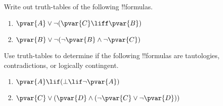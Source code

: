 \documentclass[../../../include/open-logic-section]{subfiles}
\begin{document}


\begin{prob}
    \citep[1.1 item 2]{MacFarlane-2020-PhilosophicalLogicContemporary}
    Write out truth-tables of the following !!{formula}s.
    \begin{enumerate}
    \item $\pvar{A} \lor \lnot (\pvar{C} \liff \pvar{B})$
    \item $\pvar{B} \lor \lnot (\lnot \pvar{B} \land \lnot \pvar{C})$
    \end{enumerate}
\end{prob}

\begin{prob}
    \citep[1.1 item 3]{MacFarlane-2020-PhilosophicalLogicContemporary}
    Use truth-tables to determine if the following !!{formula}s are 
    tautologies, contradictions, or logically contingent.
    \begin{enumerate}
    \item $\pvar{A}\lif(\bot\lif\lnot\pvar{A})$
    \item $\pvar{C}\lor(\pvar{D}\land(\lnot \pvar{C}\lor \lnot \pvar{D}))$
    \end{enumerate}
\end{prob}
    
\end{document}
